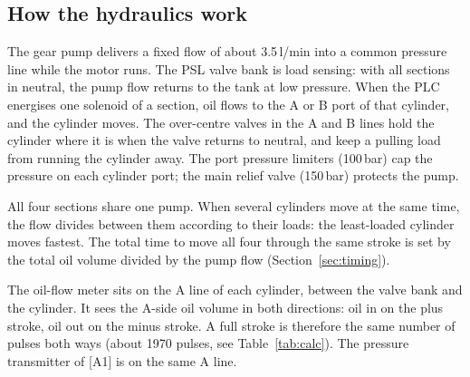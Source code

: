 \documentclass[11pt,a4paper]{article}
\begin{document}
\subsection{How the hydraulics work}
The gear pump delivers a fixed flow of about 3.5\,l/min into a common pressure line while the motor
runs. The PSL valve bank is load sensing: with all sections in neutral, the pump flow returns to the
tank at low pressure. When the PLC energises one solenoid of a section, oil flows to the A or B
port of that cylinder, and the cylinder moves. The over-centre valves in the A and B lines hold the
cylinder where it is when the valve returns to neutral, and keep a pulling load from running the
cylinder away. The port pressure limiters (100\,bar) cap the pressure on each cylinder port; the
main relief valve (150\,bar) protects the pump.

All four sections share one pump. When several cylinders move at the same time, the flow divides
between them according to their loads: the least-loaded cylinder moves fastest. The total time to
move all four through the same stroke is set by the total oil volume divided by the pump flow
(Section~\ref{sec:timing}).

The oil-flow meter sits on the A line of each cylinder, between the valve bank and the cylinder.
It sees the A-side oil volume in both directions: oil in on the plus stroke, oil out on the minus
stroke. A full stroke is therefore the same number of pulses both ways (about 1970 pulses, see
Table~\ref{tab:calc}). The pressure transmitter of [A1] is on the same A line.
\end{document}
